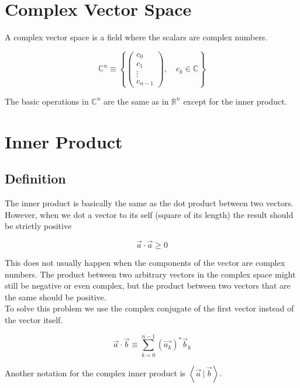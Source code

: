 \documentclass[a4paper]{article}
\author{Paolo Bettelini}
\date{}
\newcommand{\braket}[1]{\left\langle#1\right\rangle}
\newcommand{\innerprod}[2]{\braket{#1\,|\,#2}}
\begin{document}
\maketitle
\tableofcontents
\pagebreak

\section{Complex Vector Space}

A complex vector space is a field where the scalars are complex numbers.

\[
    \mathbb{C}^n \equiv
    \left\{
        \begin{pmatrix}
            c_0 \\
            c_1 \\
            \vdots \\
            c_{n-1}
        \end{pmatrix}
        ,\quad c_k \in \mathbb{C}
    \right\}
\]

The basic operations in \(\mathbb{C}^n\) are the same as in \(\mathbb{R}^n\) except for the inner product. 

\section{Inner Product}

\subsection{Definition}

The inner product is basically the same as the dot product between two vectors.
However, when we dot a vector to its self (square of its length) the result should be strictly positive

\[
    \vec{a} \cdot \vec{a} \geq 0
\]

This does not usually happen when the components of the vector are complex numbers.
The product between two arbitrary vectors in the complex space might still be negative or even complex,
but the product between two vectors that are the same should be positive.\\
To solve this problem we use the complex conjugate of the first vector instead of the vector itself.

\[
    \vec{a} \cdot \vec{b} \equiv \sum_{k=0}^{n-1} {(\vec{a_k})}^{*} \vec{b}_k
\]

Another notation for the complex inner product is \(\innerprod{\vec{a}}{\vec{b}}\).
\end{document}
